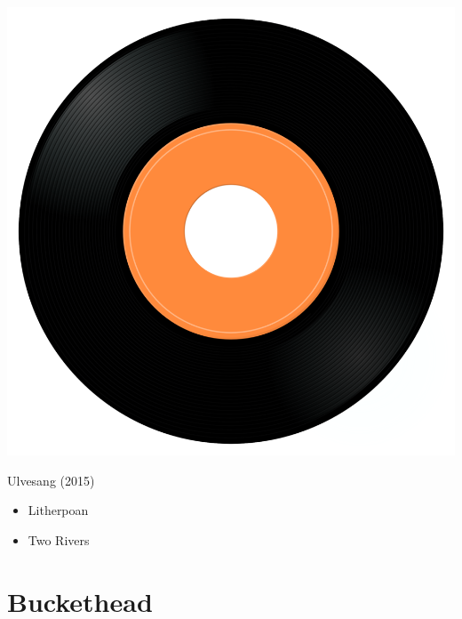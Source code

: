 \begin{minipage}[t]{0.25\textwidth}
\captionsetup{type=figure}
\includegraphics[width=\textwidth]{Images/cover.png}
\caption*{Ulvesang (2015)}
\end{minipage}
\begin{minipage}[t]{0.25\textwidth}\vspace{0pt}
\begin{itemize}[nosep,leftmargin=1em,labelwidth=*,align=left]
	\setlength{\itemsep}{0pt}
	\item Litherpoan
	\item Two Rivers
\end{itemize}
\end{minipage}


\section{Buckethead}


